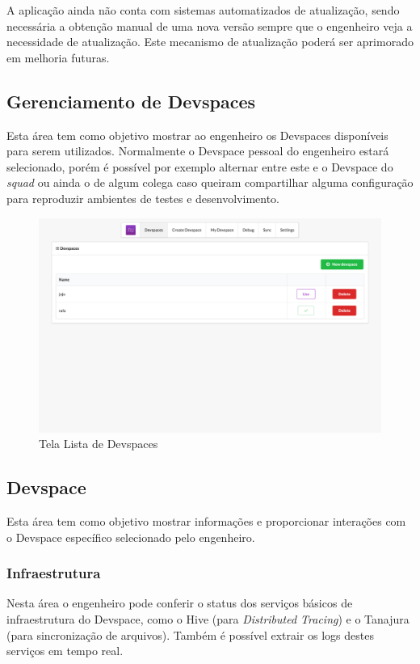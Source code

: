 A aplicação ainda não conta com sistemas automatizados de atualização, sendo necessária a obtenção manual de uma nova versão sempre que o engenheiro veja a necessidade de atualização. Este mecanismo de atualização poderá ser aprimorado em melhoria futuras.

\subsection{Gerenciamento de Devspaces}
Esta área tem como objetivo mostrar ao engenheiro os Devspaces disponíveis para serem utilizados. Normalmente o Devspace pessoal do engenheiro estará selecionado, porém é possível por exemplo alternar entre este e o Devspace do \textit{squad} ou ainda o de algum colega caso queiram compartilhar alguma configuração para reproduzir ambientes de testes e desenvolvimento.

\begin{figure}[htb]
	\caption{\label{fig_frontend_devspaces}Tela Lista de Devspaces}
	\begin{center}
	\includegraphics[width=\textwidth,keepaspectratio]{pictures/frontend/frontend-devspaces.png}
	\end{center}
\end{figure}



\subsection{Devspace}
Esta área tem como objetivo mostrar informações e proporcionar interações com o Devspace específico selecionado pelo engenheiro.

\subsubsection{Infraestrutura}
Nesta área o engenheiro pode conferir o status dos serviços básicos de infraestrutura do Devspace, como o Hive (para \textit{Distributed Tracing}) e o Tanajura (para sincronização de arquivos). Também é possível extrair os logs destes serviços em tempo real.

